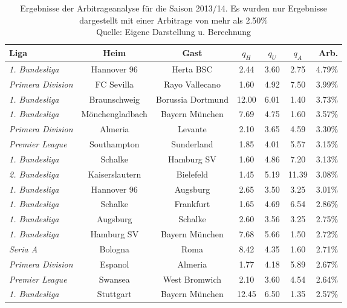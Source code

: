 \begin{table}
\centering
	\begin{tabular}{lcccccr}
	\toprule
	\textbf{Liga} & \textbf{Heim} & \textbf{Gast} & $ q_H $ & $ q_U $ & $ q_A $ & \textbf{Arb.} \\
	\midrule
	\textit{1. Bundesliga} & Hannover 96 & Herta BSC & 2.44 & 3.60 & 2.75 & 4.79\% \\
	\textit{Primera Division} & FC Sevilla & Rayo Vallecano & 1.60 & 4.92 & 7.50 & 3.99\% \\
	\textit{1. Bundesliga} & Braunschweig & Borussia Dortmund & 12.00 & 6.01 & 1.40 & 3.73\% \\
	\textit{1. Bundesliga} & Mönchengladbach & Bayern München & 7.69 & 4.75 & 1.60 & 3.57\% \\
	\textit{Primera Division} & Almeria & Levante & 2.10 & 3.65 & 4.59 & 3.30\% \\
	\textit{Premier League} & Southampton & Sunderland & 1.85 & 4.01 & 5.57 & 3.15\% \\
	\textit{1. Bundesliga} & Schalke & Hamburg SV & 1.60 & 4.86 & 7.20 & 3.13\% \\
	\textit{2. Bundesliga} & Kaiserslautern & Bielefeld & 1.45 & 5.19 & 11.39 & 3.08\% \\
	\textit{1. Bundesliga} & Hannover 96 & Augsburg & 2.65 & 3.50 & 3.25 & 3.01\% \\
	\textit{1. Bundesliga} & Schalke & Frankfurt & 1.65 & 4.69 & 6.54 & 2.86\% \\
	\textit{1. Bundesliga} & Augsburg & Schalke & 2.60 & 3.56 & 3.25 & 2.75\% \\
	\textit{1. Bundesliga} & Hamburg SV & Bayern München & 7.68 & 5.66 & 1.50 & 2.72\% \\
	\textit{Seria A} & Bologna & Roma & 8.42 & 4.35 & 1.60 & 2.71\% \\
	\textit{Primera Division} & Espanol & Almeria & 1.77 & 4.18 & 5.89 & 2.67\% \\
	\textit{Premier League} & Swansea & West Bromwich & 2.10 & 3.60 & 4.54 & 2.64\% \\
	\textit{1. Bundesliga} & Stuttgart & Bayern München & 12.45 & 6.50 & 1.35 & 2.57\% \\
	\toprule
	\end{tabular}
	
\caption[Ergebnisse der Arbitrageanalyse Saison 2013/14]{Ergebnisse der Arbitrageanalyse für die Saison 2013/14. Es wurden nur Ergebnisse dargestellt mit einer Arbitrage von mehr als 2.50\% \\ Quelle: Eigene Darstellung u. Berechnung}
\label{tab:arbitrageErgebnisse}
\end{table}


